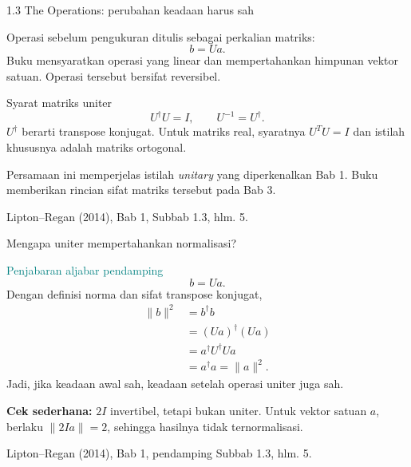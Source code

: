 \documentclass[aspectratio=169,11pt]{beamer}
\newcommand{\bookref}[1]{\par\vfill{\scriptsize\color{gray}Lipton--Regan (2014), Bab 1, #1.}}
\begin{document}
\begin{frame}{1.3 The Operations: perubahan keadaan harus sah}
\small

Operasi sebelum pengukuran ditulis sebagai perkalian matriks:
\[
 b=Ua.
\]
Buku mensyaratkan operasi yang linear dan mempertahankan himpunan vektor satuan. Operasi tersebut bersifat reversibel.
\begin{block}{Syarat matriks uniter}
\[
 U^\dagger U=I,\qquad U^{-1}=U^\dagger.
\]
$U^\dagger$ berarti transpose konjugat. Untuk matriks real, syaratnya $U^TU=I$ dan istilah khususnya adalah matriks ortogonal.
\end{block}
\small
Persamaan ini memperjelas istilah \textit{unitary} yang diperkenalkan Bab 1. Buku memberikan rincian sifat matriks tersebut pada Bab 3.
\bookref{Subbab 1.3, hlm. 5}

\end{frame}

\begin{frame}{Mengapa uniter mempertahankan normalisasi?}

\textcolor{teal}{\small Penjabaran aljabar pendamping}
\[
 b=Ua.
\]
Dengan definisi norma dan sifat transpose konjugat,
\begin{align*}
 \|b\|^2&=b^\dagger b\\
 &=(Ua)^\dagger(Ua)\\
 &=a^\dagger U^\dagger Ua\\
 &=a^\dagger a=\|a\|^2.
\end{align*}
Jadi, jika keadaan awal sah, keadaan setelah operasi uniter juga sah.
\par\medskip
\textbf{Cek sederhana:} $2I$ invertibel, tetapi bukan uniter. Untuk vektor satuan $a$, berlaku $\|2Ia\|=2$, sehingga hasilnya tidak ternormalisasi.
\bookref{pendamping Subbab 1.3, hlm. 5}

\end{frame}
\end{document}
